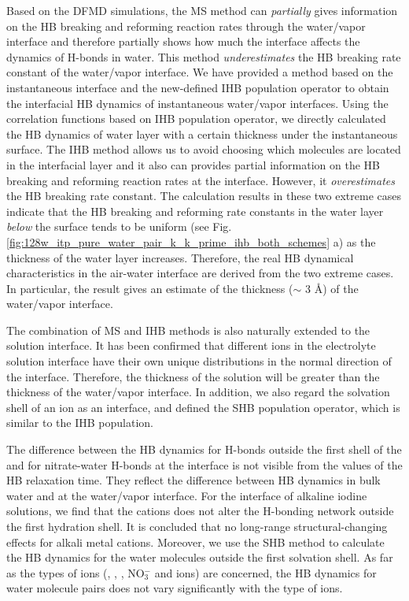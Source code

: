Based on the DFMD simulations, the MS method %
can \emph{partially} gives information on the HB breaking and reforming reaction
rates through the water/vapor interface and therefore partially shows how much the interface affects the dynamics of H-bonds in water. 
This method \emph{underestimates} the HB breaking rate constant of the water/vapor interface. 
We have provided a method based on the instantaneous interface and the new-defined
IHB population operator to obtain the interfacial HB dynamics of instantaneous water/vapor interfaces.  
Using the correlation functions based on IHB population operator, we directly calculated the HB dynamics of water layer with a certain thickness 
under the instantaneous surface. 
The IHB method allows us to avoid choosing which molecules are located in the interfacial layer and
it also can provides partial information on the HB breaking and reforming reaction rates at the interface. 
However, it \emph{overestimates} the HB breaking rate constant. The calculation results in these two extreme cases
indicate that the HB breaking and reforming rate constants in the water layer \emph{below} the surface tends to be uniform 
(see Fig.\ref{fig:128w_itp_pure_water_pair_k_k_prime_ihb_both_schemes} a) 
as the thickness of the water layer increases. Therefore, the real HB dynamical characteristics in the air-water interface 
are derived from the two extreme cases. 
In particular, the result gives an estimate of the thickness ($\sim$ 3 \AA) of the water/vapor interface.

The combination of MS and IHB methods is also naturally extended to the solution interface. 
It has been confirmed that different ions in the electrolyte solution interface have their own unique distributions in the normal direction of the interface. 
Therefore, the thickness of the solution will be greater than the thickness of the water/vapor interface. 
In addition, we also regard the solvation shell of an ion as an interface, 
and defined the SHB population operator, which is similar to the IHB population.

The difference between the HB dynamics for H-bonds outside the first shell of the \Li and for nitrate-water H-bonds 
at the interface is not visible from the values of the HB relaxation time. They reflect the difference between HB dynamics in 
bulk water and at the water/vapor interface. For the interface of alkaline iodine solutions, we find 
that the cations does not alter the H-bonding network outside the first hydration shell. 
It is concluded that no long-range structural-changing effects for alkali metal cations.
Moreover, we use the SHB method to calculate the HB dynamics for the water molecules outside the first solvation shell.
As far as the types of ions (\Li, \Na, \K, NO$^-_3$ and \I ions) are concerned, 
the HB dynamics for water molecule pairs does not vary significantly with the type of ions.


